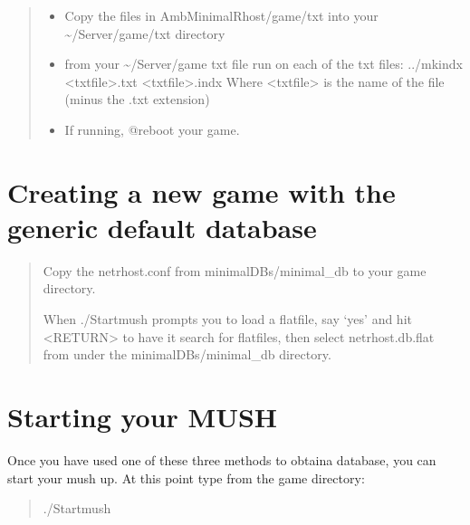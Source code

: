 \documentclass[letterpaper,10pt,english]{sphinxmanual}
\begin{document}
\begin{quote}
\begin{itemize}
\item {} 
\sphinxAtStartPar
Copy the files in Amb\sphinxhyphen{}MinimalRhost/game/txt into your \textasciitilde{}/Server/game/txt directory

\item {} 
\sphinxAtStartPar
from your \textasciitilde{}/Server/game txt file run on each of the txt files:
../mkindx \textless{}txtfile\textgreater{}.txt \textless{}txtfile\textgreater{}.indx
Where \textless{}txtfile\textgreater{} is the name of the file (minus the .txt extension)

\item {} 
\sphinxAtStartPar
If running, @reboot your game.

\end{itemize}
\end{quote}


\section{Creating a new game with the generic default database}
\label{\detokenize{04-configure:creating-a-new-game-with-the-generic-default-database}}\begin{quote}

\sphinxAtStartPar
Copy the netrhost.conf from minimal\sphinxhyphen{}DBs/minimal\_db to your game directory.

\sphinxAtStartPar
When ./Startmush prompts you to load a flatfile, say ‘yes’ and hit \textless{}RETURN\textgreater{}
to have it search for flatfiles, then select netrhost.db.flat from under
the minimal\sphinxhyphen{}DBs/minimal\_db directory.
\end{quote}


\section{Starting your MUSH}
\label{\detokenize{04-configure:starting-your-mush}}
\sphinxAtStartPar
Once you have used one of these three methods to obtaina database, you can start your mush up.
At this point type from the game directory:
\begin{quote}

\sphinxAtStartPar
./Startmush
\end{quote}
\end{document}
